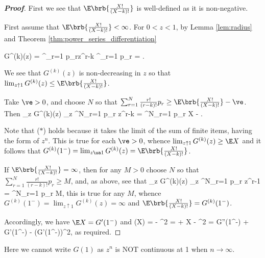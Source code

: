 \begin{proof}[\bf Proof]%
First we see that $\E\brb{\frac{X!}{(X-k)!}}$ is well-defined as it is non-negative.

First assume that $\E\brb{\frac{X!}{(X-k)!}} < \infty$. For $0 < z < 1$, by Lemma \ref{lem:radius} and Theorem \ref{thm:power_series_differentiation}

\be
G^{(k)}(z) = \sum^\infty_{r=1} p_rz^{r-k} \leq \sum^\infty_{r=1}  p_r = \E{}.
\ee

We see that $G^{(k)}(z)$ is non-decreasing in $z$ so that $\lim_{z\uparrow 1} G^{(k)}(z) \leq \E\brb{\frac{X!}{(X-k)!}}$.

Take $\ve > 0$, and choose $N$ so that $\sum^N_{r=1} \frac{r!}{(r-k)!} p_r \geq \E\brb{\frac{X!}{(X-k)!}} -\ve$. Then
\be
\lim_{z} G^{(k)}(z) \geq \lim_{z} \sum^N_{r=1}  p_r z^{r-k} = \sum^N_{r=1}  p_r \geq \E X - \ve.
\ee

Note that ($*$) holds because it takes the limit of the sum of finite items, having the form of $z^n$. This is true for each $\ve > 0$, whence $\lim_{z\uparrow 1} G^{(k)}(z) \geq \E X$ and it follows that $G^{(k)}(1^-) = \lim_{z\ua 1} G^{(k)}(z) = \E\brb{\frac{X!}{(X-k)!}}$.

If $\E\brb{\frac{X!}{(X-k)!}} = \infty$, then for any $M > 0$ choose $N$ so that $\sum^N_{r=1} \frac{r!}{(r-k)!} p_r \geq M$, and, as above, see that
\be
\lim_{z} G^{(k)}(z) \geq \lim_{z} \sum^N_{r=1}  p_r z^{r-1} = \sum^N_{r=1}  p_r \geq M,
\ee
this is true for any $M$, whence $G^{(k)}(1^-) = \lim_{z\uparrow 1} G^{(k)}(z) = \infty$ and $\E\brb{\frac{X!}{(X-k)!}} = G^{(k)}(1^-)$.

Accordingly, we have $\E X = G'(1^-)$ and
\be
\var(X) = \E{} - ^2 = \E{} + \E X - ^2 = G''(1^-) + G'(1^-) - (G'(1^-))^2,
\ee
as required.
\end{proof}


\begin{remark}
Here we cannot write $G(1)$ as $z^{n}$ is NOT continuous at 1 when $n\to \infty$.
\end{remark}


